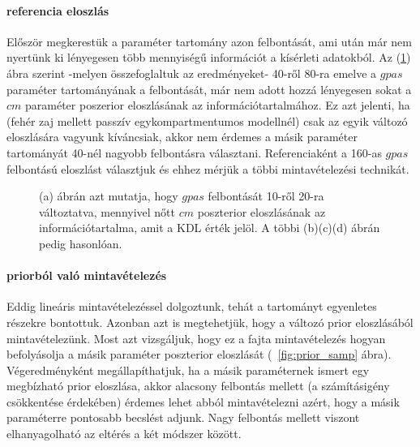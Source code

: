 \paragraph{referencia eloszlás}
Először megkerestük a paraméter tartomány azon felbontását, ami után már nem nyertünk ki lényegesen több mennyiségű információt a kísérleti adatokból. Az (\ref{fig:ref}) ábra szerint -melyen összefoglaltuk az eredményeket- 40-ről 80-ra emelve a $gpas$ paraméter tartományának a felbontását, már nem adott hozzá lényegesen sokat a $cm$ paraméter poszerior eloszlásának az információtartalmához. Ez azt jelenti, ha (fehér zaj mellett passzív egykompartmentumos modellnél) csak az egyik változó eloszlására vagyunk kíváncsiak, akkor nem érdemes a másik paraméter tartományát 40-nél nagyobb felbontásra választani. Referenciaként a 160-as $gpas$ felbontású eloszlást választjuk és ehhez mérjük a többi mintavételezési technikát.

\begin{figure}
	\hfill
	\hfill
	\hfill
	\vfill
	\hfill
	\caption[Referencia felbontás]{(a) ábrán azt mutatja, hogy $gpas$ felbontását 10-ről 20-ra változtatva, mennyivel nőtt $cm$ poszterior eloszlásának az információtartalma, amit a KDL érték jelöl. A többi (b)(c)(d) ábrán pedig hasonlóan.}%
	\label{fig:ref}
\end{figure}

\paragraph{priorból való mintavételezés}
Eddig lineáris mintavételezéssel dolgoztunk, tehát a tartományt egyenletes részekre bontottuk. Azonban azt is megtehetjük, hogy a változó prior eloszlásából mintavételezünk. Most azt vizsgáljuk, hogy ez a fajta mintavételezés hogyan befolyásolja a másik paraméter poszterior eloszlását (~\ref{fig:prior_samp} ábra). Végeredményként megállapíthatjuk, ha a másik paraméternek ismert egy megbízható prior eloszlása, akkor alacsony felbontás mellett (a számításigény csökkentése érdekében) érdemes lehet abból mintavételezni azért, hogy a másik paraméterre pontosabb becslést adjunk. Nagy felbontás mellett viszont elhanyagolható az eltérés a két módszer között.

